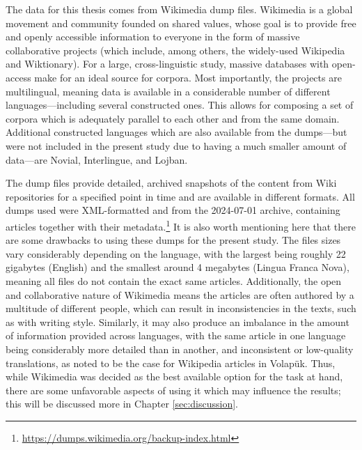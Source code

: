 \documentclass[12pt,a4paper]{article}
\numberwithin{figure}{section}
\numberwithin{table}{section}
\numberwithin{definition}{section}
\begin{document}
The data for this thesis comes from Wikimedia dump files. Wikimedia is a global movement and community founded on shared values, whose goal is to provide free and openly accessible information to everyone in the form of massive collaborative projects (which include, among others, the widely-used Wikipedia and Wiktionary). For a large, cross-linguistic study, massive databases with open-access make for an ideal source for corpora. Most importantly, the projects are multilingual, meaning data is available in a considerable number of different languages---including several constructed ones. This allows for composing a set of corpora which is adequately parallel to each other and from the same domain. Additional constructed languages which are also available from the dumps---but were not included in the present study due to having a much smaller amount of data---are Novial, Interlingue, and Lojban.

The dump files provide detailed, archived snapshots of the content from Wiki repositories for a specified point in time and are available in different formats. All dumps used were XML-formatted and from the 2024-07-01 archive, containing articles together with their metadata.\footnote{\url{https://dumps.wikimedia.org/backup-index.html}} It is also worth mentioning here that there are some drawbacks to using these dumps for the present study. The files sizes vary considerably depending on the language, with the largest being roughly 22 gigabytes (English) and the smallest around 4 megabytes (Lingua Franca Nova), meaning all files do not contain the exact same articles. Additionally, the open and collaborative nature of Wikimedia means the articles are often authored by a multitude of different people, which can result in inconsistencies in the texts, such as with writing style. Similarly, it may also produce an imbalance in the amount of information provided across languages, with the same article in one language being considerably more detailed than in another, and inconsistent or low-quality translations, as \textcite{Novikov2022article} noted to be the case for Wikipedia articles in Volapük. Thus, while Wikimedia was decided as the best available option for the task at hand, there are some unfavorable aspects of using it which may influence the results; this will be discussed more in Chapter \ref{sec:discussion}.

\end{document}
